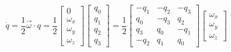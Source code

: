 \begin{equation*}
  \dot{q} = \frac{1}{2} \vec{\omega} \cdot q =
  \frac{1}{2}
  \begin{bmatrix}
  0 \\ \omega_x \\ \omega_y \\ \omega_z
  \end{bmatrix}
  \begin{bmatrix}
  q_0 \\ q_1 \\ q_2 \\ q_3
  \end{bmatrix} =
  \frac{1}{2}
  \begin{bmatrix}
  -q_1  & -q_2  & -q_3 \\
   q_0  & -q_3  &  q_2 \\
   q_3  &  q_0  & -q_1 \\
  -q_2  &  q_1  & q_0
  \end{bmatrix}
  \begin{bmatrix}
  \omega_x \\ \omega_y \\ \omega_z
  \end{bmatrix}
\end{equation*}
